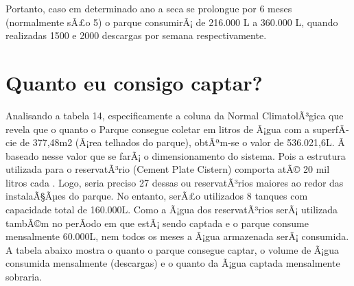 Portanto, caso em determinado ano a seca se prolongue por 6 meses (normalmente sÃ£o 5) o parque consumirÃ¡ de 216.000 L a 360.000 L, quando realizadas 1500 e 2000 descargas por semana respectivamente. 

\section{Quanto eu consigo captar?}

Analisando a tabela 14, especificamente a coluna da Normal ClimatolÃ³gica que revela que o quanto o Parque consegue coletar em litros de Ã¡gua com a superfÃ­cie de 377,48m2 (Ã¡rea telhados do parque), obtÃªm-se o valor de 536.021,6L. Ã baseado nesse valor que se farÃ¡ o dimensionamento do sistema. Pois a estrutura utilizada para o reservatÃ³rio (Cement Plate Cistern) comporta atÃ© 20 mil litros cada \cite{gnadlinger1999technical}. Logo, seria preciso 27 dessas ou reservatÃ³rios maiores ao redor das instalaÃ§Ãµes do parque. No entanto, serÃ£o utilizados 8 tanques com capacidade total de 160.000L. Como a Ã¡gua dos reservatÃ³rios serÃ¡ utilizada tambÃ©m no perÃ­odo em que estÃ¡ sendo captada e o parque consume mensalmente 60.000L, nem todos os meses a Ã¡gua armazenada serÃ¡ consumida. A tabela abaixo mostra o quanto o parque consegue captar, o volume de Ã¡gua consumida mensalmente (descargas) e o quanto da Ã¡gua captada mensalmente sobraria.

